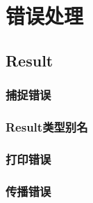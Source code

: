 \chapter{错误处理}\label{ch07}

\section{Result}

\subsection{捕捉错误}

\subsection{Result类型别名}

\subsection{打印错误}

\subsection{传播错误}\label{properror}